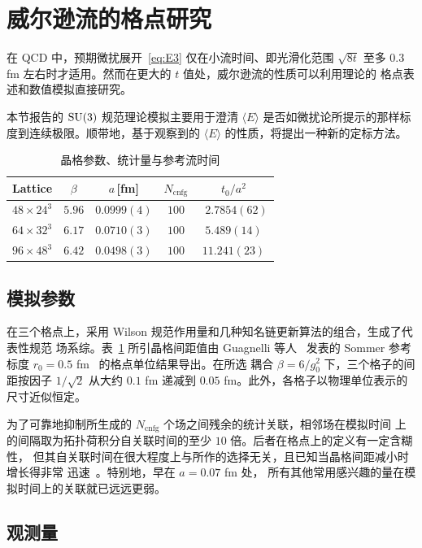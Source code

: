 \section{威尔逊流的格点研究}

在 QCD 中，预期微扰展开~\eqref{eq:E3} 仅在小流时间、即光滑化范围 $\sqrt{8t}$
至多 $0.3$ fm 左右时才适用。然而在更大的 $t$ 值处，威尔逊流的性质可以利用理论的
格点表述和数值模拟直接研究。

本节报告的 $\mathrm{SU(3)}$ 规范理论模拟主要用于澄清 $\langle E\rangle$
是否如微扰论所提示的那样标度到连续极限。顺带地，基于观察到的 $\langle E\rangle$
的性质，将提出一种新的定标方法。

\begin{table}[ht]
\centering
\caption{晶格参数、统计量与参考流时间}
\label{tab:params}
\begin{tabular}{ccccc}
\hline
Lattice & $\beta$ & $a$\,[fm] & $N_{\mathrm{cnfg}}$ & $t_0/a^2$ \\
\hline
$48\times24^3$ & $5.96$ & $0.0999(4)$ & $100$ & $\phantom{0}2.7854(62)$ \\
$64\times32^3$ & $6.17$ & $0.0710(3)$ & $100$ & $\phantom{0}5.489(14)\phantom{0}$ \\
$96\times48^3$ & $6.42$ & $0.0498(3)$ & $100$ & $11.241(23)$ \\
\hline
\end{tabular}
\end{table}

\subsection{模拟参数}

在三个格点上，采用 Wilson 规范作用量和几种知名链更新算法的组合，生成了代表性规范
场系综。表~\ref{tab:params} 所引晶格间距值由 Guagnelli 等人~\cite{GuagnelliEtAl}
发表的 Sommer 参考标度 $r_0=0.5$ fm~\cite{SommerScale} 的格点单位结果导出。在所选
耦合 $\beta=6/g_0^2$ 下，三个格子的间距按因子 $1/\sqrt{2}$ 从大约 $0.1$ fm 递减到
$0.05$ fm。此外，各格子以物理单位表示的尺寸近似恒定。

为了可靠地抑制所生成的 $N_{\mathrm{cnfg}}$ 个场之间残余的统计关联，相邻场在模拟时间
上的间隔取为拓扑荷积分自关联时间的至少 $10$ 倍。后者在格点上的定义有一定含糊性，
但其自关联时间在很大程度上与所作的选择无关，且已知当晶格间距减小时增长得非常
迅速~\cite{DelDebbioTauQ,StefanConference}。特别地，早在 $a=0.07$ fm 处，
所有其他常用感兴趣的量在模拟时间上的关联就已远远更弱。


\subsection{观测量}

